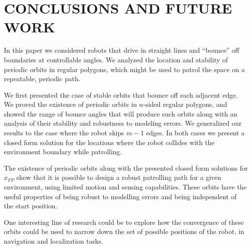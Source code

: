 \documentclass[letterpaper, 10 pt, conference]{ieeeconf}  %
\begin{document}


\section{CONCLUSIONS AND FUTURE WORK} \label{conclusion}

In this paper we considered robots that drive in straight 
lines and “bounce” off boundaries at controllable angles. 
We analysed the location and stability of periodic orbits in 
regular polygons, which might be used to patrol the space 
on a repeatable, periodic path.

We first presented the case of stable orbits that bounce 
off each adjacent edge. We proved the existence of periodic
orbits in $n$-sided regular polygons, and showed the range of
bounce angles that will produce such orbits along with an analysis 
of their stability and robustness to modeling errors.
We generalized our results to the case
where the robot skips $m-1$ edges. 
In both cases we present a closed form solution for the locations
where the robot collides with the environment boundary while 
patrolling. 

The existence of periodic orbits along with the presented 
closed form solutions for $x_{FP}$ show that it is possible to 
design a robust patrolling path for a given environment, using limited motion
and sensing capabilities. These orbits
have the useful properties of being robust to modelling errors and being
independent of the start position.

One interesting line of research could be to explore how the convergence of
these orbits could be used to narrow down the set of possible positions of the
robot, in navigation and localization tasks.
\end{document}
